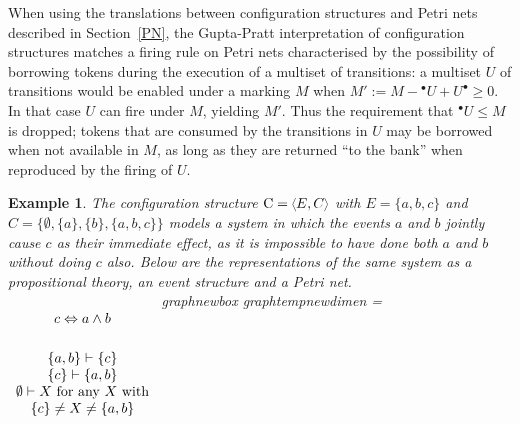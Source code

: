 \documentclass[twocolumn]{article}
\newtheorem{exam}{Example}
\newenvironment{example}[1]{\begin{exam} \rm \label{ex-#1} }{\end{exam}}
\newcommand{\turn}{\vdash}                              \newcommand{\dbigcup}{\bigcup_{\uparrow}}		\newcommand{\nbigcup}{\bigcup_{\bullet}}		\newcommand{\nbigcap}{\bigcap_{\bullet}}		\newcommand{\bbigcup}{\overline{\bigcup}}		\newcommand{\bbigcap}{\overline{\bigcap}}		\newcommand{\nbbigcap}{\bbigcap_{\bullet}}		\newcommand{\fbbigcup}{\overline{\bigcup}^f}		\newcommand{\bbbigcup}{\overline{\bigcup}^2}		\newcommand{\dcup}{~~\makebox[0pt]{\LARGE$\cdot$}\makebox[0pt]{$\cup$}~~}
\begin{document}
When using the translations between configuration structures and Petri
nets described in Section~\ref{PN}, the Gupta-Pratt interpretation of
configuration structures matches a firing rule on Petri nets
characterised by the possibility of borrowing tokens during the execution
of a multiset of transitions: a multiset $U$ of transitions would be
enabled under a marking $M$ when $M':=M - \mbox{$^\bullet U$} +
U^\bullet \geq 0$. In that case $U$ can fire under $M$, yielding $M'$.
Thus the requirement that $\mbox{$^\bullet U$} \leq M$ is dropped;
tokens that are consumed by the transitions in $U$ may be borrowed
when not available in $M$, as long as they are returned ``to the
bank'' when reproduced by the firing of $U$.

\begin{example}{causality}
The configuration structure $\eC=\tuple{E,C}$ with $E=\{a,b,c\}$ and
$C=\{\emptyset, \{a\}, \{b\}, \{a,b,c\}\}$ models a system in which the
events $a$ and $b$ jointly cause $c$ as their \emph{immediate} effect,
as it is impossible to have done both $a$ and $b$ without doing $c$ also.
Below are the representations of the same system as a propositional
theory, an event structure and a Petri net.
\\
$\begin{array}[t]{c}
\mbox{}\\
c \Leftrightarrow a \wedge b\\
\mbox{}\\[1ex]
\{a,b\} \turn \{c\} \\
\{c\} \turn \{a,b\} \\
\emptyset \turn X \mbox{~for any $X$ with}\\ \{c\} \neq X \neq \{a,b\}
\end{array}$
\hfill\hfill
\expandafter\ifx\csname graph\endcsname\relax \csname newbox\endcsname\graph\fi
\expandafter\ifx\csname graphtemp\endcsname\relax \csname newdimen\endcsname\graphtemp\fi
\setbox\graph=
\end{example}
\end{document}
